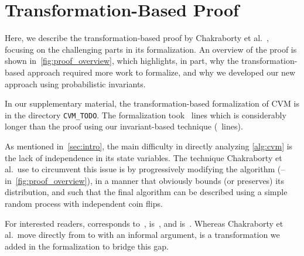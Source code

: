 \section{Transformation-Based Proof}\label{sec:transformation_based_proof}
Here, we describe the transformation-based proof by Chakraborty et al.~\cite{chakraborty2023}, focusing on the challenging parts in its formalization.
An overview of the proof is shown in~\cref{fig:proof_overview}, which highlights, in part, why the transformation-based approach required more work to formalize, and why we developed our new approach using probabilistic invariants.
\begin{note}
In our supplementary material, the transformation-based formalization of CVM is in the directory \verb|CVM_TODO|.
The formalization took \locold~lines which is considerably longer than the proof using our invariant-based technique (\locnew~lines).
\lipicsEnd\end{note}

As mentioned in~\cref{sec:intro}, the main difficulty in directly analyzing \cref{alg:cvm} is the lack of independence in its state variables.
The technique Chakraborty et al.\ use to circumvent this issue is by progressively modifying the algorithm (-- in~\cref{fig:proof_overview}), in a manner that obviously bounds (or preserves) its distribution, and such that the final algorithm  can be described using a simple random process with independent coin flips.

For interested readers,  corresponds to~\cite[Algorithm 1]{chakraborty2023},  is~\cite[Algorithm 2]{chakraborty2023}, and  is~\cite[Algorithm 3]{chakraborty2023}.
Whereas Chakraborty et al.\ move directly from  to  with an informal argument,  is a transformation we added in the formalization to bridge this gap.

